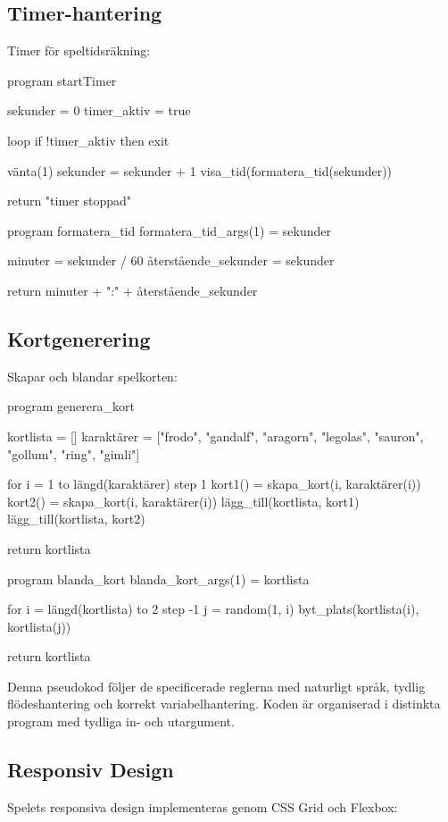 \documentclass[a4paper,12pt]{article}
\begin{document}
\subsection*{Timer-hantering}
Timer för speltidsräkning:

\begin{codebox}
program startTimer

sekunder = 0
timer_aktiv = true

loop
    if !timer_aktiv then
        exit
        
    vänta(1)
    sekunder = sekunder + 1
    visa_tid(formatera_tid(sekunder))

return "timer stoppad"

program formatera_tid
formatera_tid_args(1) = sekunder

minuter = sekunder / 60
återstående_sekunder = sekunder %

return minuter + ":" + återstående_sekunder
\end{codebox}

\subsection*{Kortgenerering}
Skapar och blandar spelkorten:

\begin{codebox}
program generera_kort

kortlista = []
karaktärer = ["frodo", "gandalf", "aragorn", "legolas", 
              "sauron", "gollum", "ring", "gimli"]

for i = 1 to längd(karaktärer) step 1
    kort1() = skapa_kort(i, karaktärer(i))
    kort2() = skapa_kort(i, karaktärer(i))
    lägg_till(kortlista, kort1)
    lägg_till(kortlista, kort2)

return kortlista

program blanda_kort
blanda_kort_args(1) = kortlista

for i = längd(kortlista) to 2 step -1
    j = random(1, i)
    byt_plats(kortlista(i), kortlista(j))

return kortlista
\end{codebox}

Denna pseudokod följer de specificerade reglerna med naturligt språk, tydlig flödeshantering och korrekt variabelhantering. Koden är organiserad i distinkta program med tydliga in- och utargument.

\subsection*{Responsiv Design}
Spelets responsiva design implementeras genom CSS Grid och Flexbox:
\end{document}
